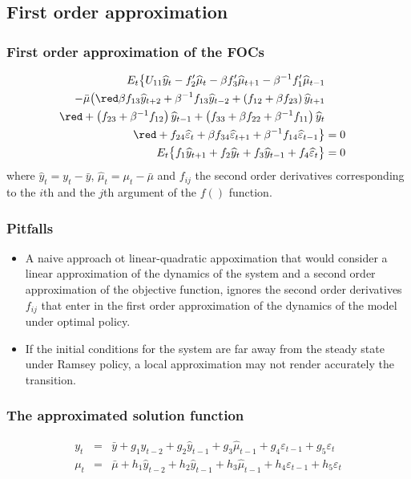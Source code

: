 \documentclass{beamer}
\begin{document}
\subsection{First order approximation}

\begin{frame}
\frametitle{First order approximation of the FOCs}
{\footnotesize
\begin{align*}
E_{t}\big\{U_{11}\widehat{y}_{t}-f_2'\widehat{\mu}_{t}-\beta f_3'\widehat{\mu}_{t+1}
-\beta^{-1}f_1'\widehat{\mu}_{t-1}\\
 -\bar\mu\big({\red \beta f_{13}\widehat{y}_{t+2}
+\beta^{-1}f_{13}\widehat{y}_{t-2}+ \left(f_{12}+\beta f_{23}\right)\widehat{y}_{t+1}}\\
{\red +\left(f_{23}+\beta^{-1}f_{12}\right)\widehat{y}_{t-1}
+\left(f_{33}+\beta
f_{22}+ 
\beta^{-1}f_{11}\right)\widehat{y}_{t}}\\
{\red +f_{24}\widehat{\varepsilon}_{t}+\beta f_{34}\widehat{\varepsilon}_{t+1}
+\beta^{-1}f_{14}\widehat{\varepsilon}_{t-1}}\big\}&=0\\
E_{t}\big\{f_{1}\widehat{y}_{t+1}+f_{2}\widehat{y}_{t}+f_{3}\widehat{y}_{t-1}+f_{4}\widehat{\varepsilon}_{t}\big\}&=0
\end{align*}
}
where $\widehat{y}_t = y_t-\bar y$, $\widehat{\mu}_t = \mu_t-\bar\mu$ and $f_{ij}$ the second order derivatives corresponding to the $i$th and the $j$th argument of the $f()$ function. 
\end{frame}


\begin{frame}
  \frametitle{Pitfalls}
\begin{itemize}
\item A naive approach ot linear-quadratic appoximation that would consider a linear approximation of the dynamics of the system and a second order approximation of the objective function, ignores the second order derivatives $f_{ij}$ that enter in the first order approximation of the dynamics of the model under optimal policy.
\item If the initial conditions for the system are far away from the steady state under Ramsey policy, a local approximation may not render accurately the transition.
\end{itemize}
\end{frame}

\begin{frame}
  \frametitle{The approximated solution function}
  \begin{eqnarray*}
    y_t &=& \bar y +g_1\widehat{y}_{t-2}+g_2\widehat{y}_{t-1}+g_3\widehat{\mu}_{t-1}+g_4\varepsilon_{t-1}+g_5\varepsilon_t\\
    \mu_t &=& \bar \mu +h_1\widehat{y}_{t-2}+h_2\widehat{y}_{t-1}+h_3\widehat{\mu}_{t-1}+h_4\varepsilon_{t-1}+h_5\varepsilon_t
  \end{eqnarray*}
\end{frame}
\end{document}

